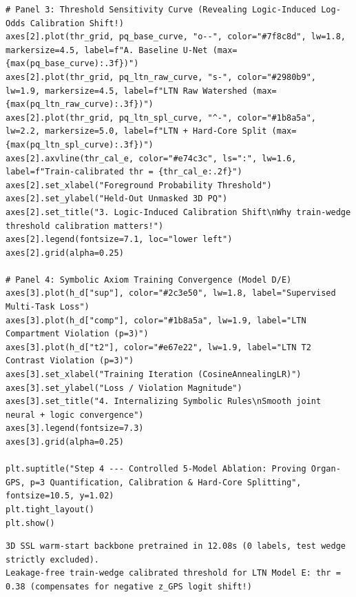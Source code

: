 \documentclass[10pt,a4paper]{article}
\begin{document}
\begin{codebox}[{In [4] $\cdot$ Python --- Step 4 -- Controlled 5-model ablation study (SSL warm-start, Organ-GPS, p=1 vs p=3, calibration)}]
\begin{lstlisting}[style=pybmed]
# Panel 3: Threshold Sensitivity Curve (Revealing Logic-Induced Log-Odds Calibration Shift!)
axes[2].plot(thr_grid, pq_base_curve, "o--", color="#7f8c8d", lw=1.8, markersize=4.5, label=f"A. Baseline U-Net (max={max(pq_base_curve):.3f})")
axes[2].plot(thr_grid, pq_ltn_raw_curve, "s-", color="#2980b9", lw=1.9, markersize=4.5, label=f"LTN Raw Watershed (max={max(pq_ltn_raw_curve):.3f})")
axes[2].plot(thr_grid, pq_ltn_spl_curve, "^-", color="#1b8a5a", lw=2.2, markersize=5.0, label=f"LTN + Hard-Core Split (max={max(pq_ltn_spl_curve):.3f})")
axes[2].axvline(thr_cal_e, color="#e74c3c", ls=":", lw=1.6, label=f"Train-calibrated thr = {thr_cal_e:.2f}")
axes[2].set_xlabel("Foreground Probability Threshold")
axes[2].set_ylabel("Held-Out Unmasked 3D PQ")
axes[2].set_title("3. Logic-Induced Calibration Shift\nWhy train-wedge threshold calibration matters!")
axes[2].legend(fontsize=7.1, loc="lower left")
axes[2].grid(alpha=0.25)

# Panel 4: Symbolic Axiom Training Convergence (Model D/E)
axes[3].plot(h_d["sup"], color="#2c3e50", lw=1.8, label="Supervised Multi-Task Loss")
axes[3].plot(h_d["comp"], color="#1b8a5a", lw=1.9, label="LTN Compartment Violation (p=3)")
axes[3].plot(h_d["t2"], color="#e67e22", lw=1.9, label="LTN T2 Contrast Violation (p=3)")
axes[3].set_xlabel("Training Iteration (CosineAnnealingLR)")
axes[3].set_ylabel("Loss / Violation Magnitude")
axes[3].set_title("4. Internalizing Symbolic Rules\nSmooth joint neural + logic convergence")
axes[3].legend(fontsize=7.3)
axes[3].grid(alpha=0.25)

plt.suptitle("Step 4 --- Controlled 5-Model Ablation: Proving Organ-GPS, p=3 Quantification, Calibration & Hard-Core Splitting", fontsize=10.5, y=1.02)
plt.tight_layout()
plt.show()
\end{lstlisting}
\end{codebox}
\begin{outbox}
\begin{lstlisting}[style=outbmed]
3D SSL warm-start backbone pretrained in 12.08s (0 labels, test wedge strictly excluded).
Leakage-free train-wedge calibrated threshold for LTN Model E: thr = 0.38 (compensates for negative z_GPS logit shift!)
\end{lstlisting}
\end{outbox}
\end{document}
